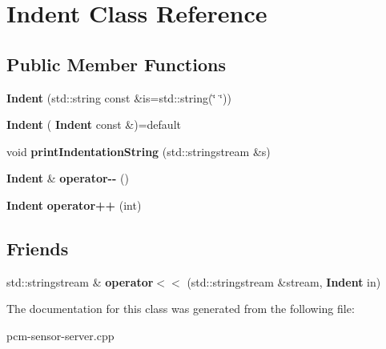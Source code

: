 \section{Indent Class Reference}
\label{classIndent}
\subsection*{Public Member Functions}
\begin{DoxyCompactItemize}
\item 
\mbox{\label{classIndent_a14695be50f0701f3304634d2d00c0431}} 
{\bfseries Indent} (std\+::string const \&is=std\+::string(\char`\"{}    \char`\"{}))
\item 
\mbox{\label{classIndent_aa97fede97203e7bfab7643f1b7d93ef7}} 
{\bfseries Indent} (\textbf{ Indent} const \&)=default
\item 
\mbox{\label{classIndent_a1fa4c9e41f82f3e10c50ce317bbf853e}} 
void {\bfseries print\+Indentation\+String} (std\+::stringstream \&s)
\item 
\mbox{\label{classIndent_a841eff581ee962cc1ec6d5b156b7cafd}} 
\textbf{ Indent} \& {\bfseries operator-\/-\/} ()
\item 
\mbox{\label{classIndent_a0d089f2f207682023f08f11ff0b7e84f}} 
\textbf{ Indent} {\bfseries operator++} (int)
\end{DoxyCompactItemize}
\subsection*{Friends}
\begin{DoxyCompactItemize}
\item 
\mbox{\label{classIndent_ace25f9661ebe1ae64d29f3890cfec734}} 
std\+::stringstream \& {\bfseries operator$<$$<$} (std\+::stringstream \&stream, \textbf{ Indent} in)
\end{DoxyCompactItemize}


The documentation for this class was generated from the following file\+:\begin{DoxyCompactItemize}
\item 
pcm-\/sensor-\/server.\+cpp\end{DoxyCompactItemize}
